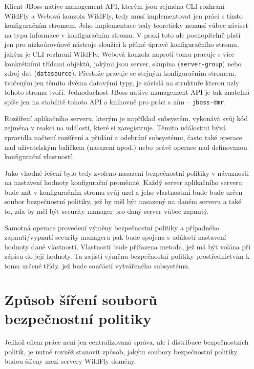 Klient JBoss native management API, kterým jsou zejména CLI rozhraní WildFly a Webová konzola WildFly, tedy musí implementovat jen práci s tímto konfiguračním stromem. Jeho implementace tedy teoreticky nemusí vůbec záviset na typu informace v konfiguračním stromu. V praxi toto ale pochopitelně platí jen pro nízkoúrovňové nástroje sloužící k přímé úpravě konfiguračního stromu, jakým je CLI rozhraní WildFly. Webová konzola naproti tomu pracuje s více konkrétními třídami objektů, jakými jsou server, skupina ({\tt server-group}) nebo zdroj dat ({\tt datasource}). Přestože pracuje se stejným konfiguračním stromem, tvořeným jen těmito dvěma datovými typy, je závislá na struktuře kterou uzly tohoto stromu tvoří. Jednoduchost JBoss native management API je tak znatelná spíše jen na stabilitě tohoto API a knihovně pro práci s ním -- {\tt jboss-dmr}. \cite{jbossDetypedManagement}

Rozšíření aplikačního serveru, kterým je například subsystém, vykonává svůj kód zejména v reakci na události, které si zaregistruje. Těmito událostmi bývá zpravidla načtení rozšíření a přidání a odebrání subsystému, často také operace nad uživatelským balíčkem (nasazení apod.) nebo právě operace nad definovanou konfigurační vlastností. \cite{WildFlyExtending}

Jako vhodné řešení bylo tedy zvoleno nasazení bezpečnostní politiky v návaznosti na nastavení hodnoty konfigurační proměnné. Každý server aplikačního serveru bude mít v konfiguračním stromu svůj uzel a jeho vlastnostmi bude bude určen soubor bezpečnostní politiky, jež by měl být nasazený na daném serveru a také to, zda by měl být security manager pro daný server vůbec zapnutý.

Samotná operace provedení výměny bezpečnostní politiky a případného zapnutí/vypnutí security manageru pak bude spojena s událostí nastavení hodnoty dané vlastnosti. Vlastnosti bude přiřazena metoda, jež má být volána při zápisu do její hodnoty. Ta zajistí výměnu bezpečnostní politiky prostřednictvím k tomu určené třídy, jež bude součástí vytvářeného subsystému.

\section{Způsob šíření souborů bezpečnostní politiky} \label{sireniSouboru}

Jelikož cílem práce není jen centralizovaná správa, ale i distribuce bezpečnostních politik, je nutné rovněž stanovit způsob, jakým soubory bezpečnostní politiky budou šířeny mezi servery WildFly domény.

